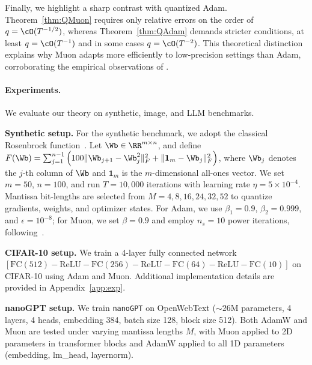 \documentclass[11pt, letterpaper]{article}
\begin{document}
Finally, we highlight a sharp contrast with quantized Adam. Theorem~\ref{thm:QMuon} requires only relative errors on the order of $q=\cO(T^{-1/2})$, whereas Theorem~\ref{thm:QAdam} demands stricter conditions, at least $q=\cO(T^{-1})$ and in some cases $q=\cO(T^{-2})$. This theoretical distinction explains why Muon adapts more efficiently to low-precision settings than Adam, corroborating the empirical observations of \citet{liu2025muon}.







\paragraph{Experiments.}
We evaluate our theory on synthetic, image, and LLM benchmarks.

\textbf{Synthetic setup.}
For the synthetic benchmark, we adopt the classical Rosenbrock function~\citep{rosenbrock1960automatic}. Let $\Wb \in \RR^{m\times n}$, and define $F(\Wb) = \sum_{j=1}^{n-1} \Big(100\|\Wb_{j+1}-\Wb_j^2\|_F^2 + \|\mathbf{1}_{m} - \Wb_j\|_F^2\Big)$, where $\Wb_j$ denotes the $j$-th column of $\Wb$ and $\mathbf{1}_m$ is the $m$-dimensional all-ones vector.
We set $m=50$, $n=100$, and run $T=10{,}000$ iterations with learning rate $\eta = 5\times 10^{-4}$. Mantissa bit-lengths are selected from $M={4,8,16,24,32,52}$ to quantize gradients, weights, and optimizer states. For Adam, we use $\beta_1=0.9$, $\beta_2=0.999$, and $\epsilon=10^{-8}$; for Muon, we set $\beta=0.9$ and employ $n_s=10$ power iterations, following~\citet{jordan2024muon}.



\textbf{CIFAR-10 setup.} We train a 4-layer fully connected network $[\mathrm{FC}(512)-\mathrm{ReLU}-\mathrm{FC}(256)-\mathrm{ReLU}-\mathrm{FC}(64)-\mathrm{ReLU}-\mathrm{FC}(10)]$ on CIFAR-10 using Adam and Muon. Additional implementation details are provided in Appendix~\ref{app:exp}.


\textbf{nanoGPT setup.} We train \texttt{nanoGPT} on OpenWebText ($\sim 26$M parameters, 4 layers, 4 heads, embedding 384, batch size 128, block size 512). Both AdamW and Muon are tested under varying mantissa lengths $M$, with Muon applied to 2D parameters in transformer blocks and AdamW applied to all 1D parameters (embedding, lm\_head, layernorm).
\end{document}
